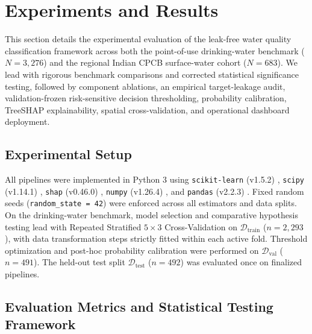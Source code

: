 \documentclass[pdflatex,sn-mathphys-num]{sn-jnl}%
\theoremstyle{thmstyleone}%
\theoremstyle{thmstyletwo}%
\theoremstyle{thmstylethree}%
\begin{document}
\section{Experiments and Results}\label{sec5}

This section details the experimental evaluation of the leak-free water quality classification framework across both the point-of-use drinking-water benchmark ($N = 3,276$) and the regional Indian CPCB surface-water cohort ($N = 683$). We lead with rigorous benchmark comparisons and corrected statistical significance testing, followed by component ablations, an empirical target-leakage audit, validation-frozen risk-sensitive decision thresholding, probability calibration, TreeSHAP explainability, spatial cross-validation, and operational dashboard deployment.

\subsection{Experimental Setup}\label{subsec5_1}

All pipelines were implemented in Python 3 using \texttt{scikit-learn} (v1.5.2) \cite{pedregosa2011}, \texttt{scipy} (v1.14.1) \cite{virtanen2020}, \texttt{shap} (v0.46.0) \cite{lundberg2017}, \texttt{numpy} (v1.26.4) \cite{harris2020}, and \texttt{pandas} (v2.2.3) \cite{mckinney2010}. Fixed random seeds (\texttt{random\_state = 42}) were enforced across all estimators and data splits. On the drinking-water benchmark, model selection and comparative hypothesis testing lead with Repeated Stratified $5 \times 3$ Cross-Validation on $\mathcal{D}_{\text{train}}$ ($n = 2,293$), with data transformation steps strictly fitted within each active fold. Threshold optimization and post-hoc probability calibration were performed on $\mathcal{D}_{\text{val}}$ ($n = 491$). The held-out test split $\mathcal{D}_{\text{test}}$ ($n = 492$) was evaluated once on finalized pipelines.

\subsection{Evaluation Metrics and Statistical Testing Framework}\label{subsec5_2}
\end{document}
